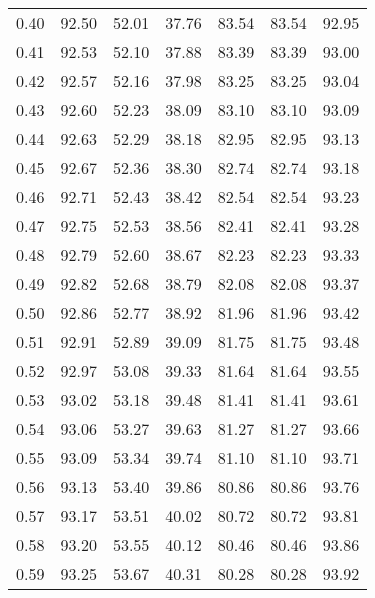 \begin{tabular}{|c|c|c|c|c|c|c|}
      0.40 &     92.50 &     52.01 &      37.76 &   83.54 &      83.54 &         92.95 \\
      0.41 &     92.53 &     52.10 &      37.88 &   83.39 &      83.39 &         93.00 \\
      0.42 &     92.57 &     52.16 &      37.98 &   83.25 &      83.25 &         93.04 \\
      0.43 &     92.60 &     52.23 &      38.09 &   83.10 &      83.10 &         93.09 \\
      0.44 &     92.63 &     52.29 &      38.18 &   82.95 &      82.95 &         93.13 \\
      0.45 &     92.67 &     52.36 &      38.30 &   82.74 &      82.74 &         93.18 \\
      0.46 &     92.71 &     52.43 &      38.42 &   82.54 &      82.54 &         93.23 \\
      0.47 &     92.75 &     52.53 &      38.56 &   82.41 &      82.41 &         93.28 \\
      0.48 &     92.79 &     52.60 &      38.67 &   82.23 &      82.23 &         93.33 \\
      0.49 &     92.82 &     52.68 &      38.79 &   82.08 &      82.08 &         93.37 \\
      0.50 &     92.86 &     52.77 &      38.92 &   81.96 &      81.96 &         93.42 \\
      0.51 &     92.91 &     52.89 &      39.09 &   81.75 &      81.75 &         93.48 \\
      0.52 &     92.97 &     53.08 &      39.33 &   81.64 &      81.64 &         93.55 \\
      0.53 &     93.02 &     53.18 &      39.48 &   81.41 &      81.41 &         93.61 \\
      0.54 &     93.06 &     53.27 &      39.63 &   81.27 &      81.27 &         93.66 \\
      0.55 &     93.09 &     53.34 &      39.74 &   81.10 &      81.10 &         93.71 \\
      0.56 &     93.13 &     53.40 &      39.86 &   80.86 &      80.86 &         93.76 \\
      0.57 &     93.17 &     53.51 &      40.02 &   80.72 &      80.72 &         93.81 \\
      0.58 &     93.20 &     53.55 &      40.12 &   80.46 &      80.46 &         93.86 \\
      0.59 &     93.25 &     53.67 &      40.31 &   80.28 &      80.28 &         93.92 \\

\end{tabular}
